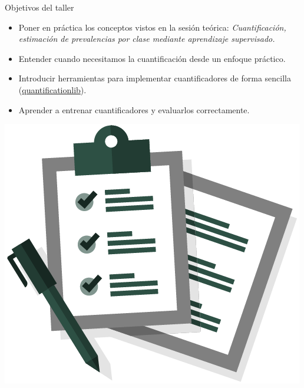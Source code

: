 \documentclass{beamer}
\begin{document}
\begin{frame}{Objetivos del taller}
\begin{itemize}
    \item Poner en práctica los conceptos vistos en la sesión teórica: \textit{Cuantificación, estimación de prevalencias por clase mediante aprendizaje supervisado.}
    \item Entender cuando necesitamos la cuantificación desde un enfoque práctico.
    \item Introducir herramientas para implementar cuantificadores de forma sencilla (\href{https://github.com/AICGijon/quantificationlib}{quantificationlib}).
    \item Aprender a entrenar cuantificadores y evaluarlos correctamente.
\end{itemize}
\centering
\includegraphics[scale=0.2]{images/objetivos.png}
\end{frame}
\end{document}
